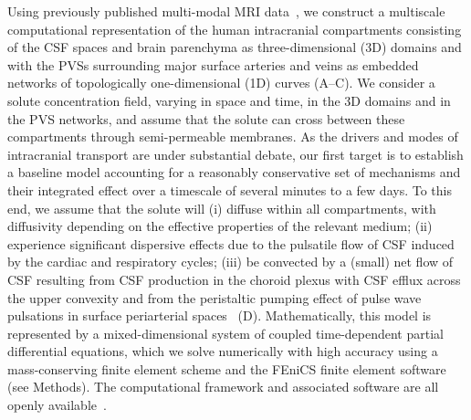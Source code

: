 \documentclass[fleqn,10pt]{wlscirep}
\begin{document}
Using previously published multi-modal MRI
data~\cite{hodneland2019new, deistung2009tof,
  schweser2012quantitative, reichenbach2012future,
  deistung2017overview}, we construct a multiscale computational
representation of the human intracranial compartments consisting of
the CSF spaces and brain parenchyma as three-dimensional (3D) domains
and with the PVSs surrounding major surface arteries and veins as
embedded networks of topologically one-dimensional (1D) curves
(A--C). We consider a solute concentration field,
varying in space and time, in the 3D domains and in the PVS networks,
and assume that the solute can cross between these compartments
through semi-permeable membranes. As the drivers and modes of
intracranial transport are under substantial
debate\cite{smith2019going, proulx2021cerebrospinal,
  bohr2022glymphatic, hladky2022glymphatic, betsholtz2024advances},
our first target is to establish a baseline model accounting for a
reasonably conservative set of mechanisms and their integrated effect
over a timescale of several minutes to a few days. To this end, we
assume that the solute will (i) diffuse within all compartments, with
diffusivity depending on the effective properties of the relevant
medium\cite{sykova2008diffusion}; (ii) experience significant
dispersive effects due to the pulsatile flow of CSF induced by the
cardiac and respiratory cycles\cite{vinje2019respiratory,
  keith2019dispersion, troyetsky2021dispersion}; (iii) be convected by
a (small) net flow of CSF resulting from CSF production in the choroid
plexus with CSF efflux across the upper
convexity\cite{hornkjol2022csf} and from the peristaltic pumping
effect of pulse wave pulsations in surface periarterial
spaces~\cite{mestre2018flow, gjerde2023directional}
(D). Mathematically, this model is represented by a
mixed-dimensional system of coupled time-dependent partial
differential equations\cite{masri2024modelling}, which we solve
numerically with high accuracy using a mass-conserving finite element
scheme and the FEniCS finite element software\cite{alnaes2015fenics,
  kuchta2020assembly} (see Methods). The computational framework and
associated software are all openly available~\cite{ZENODO}.

\end{document}
